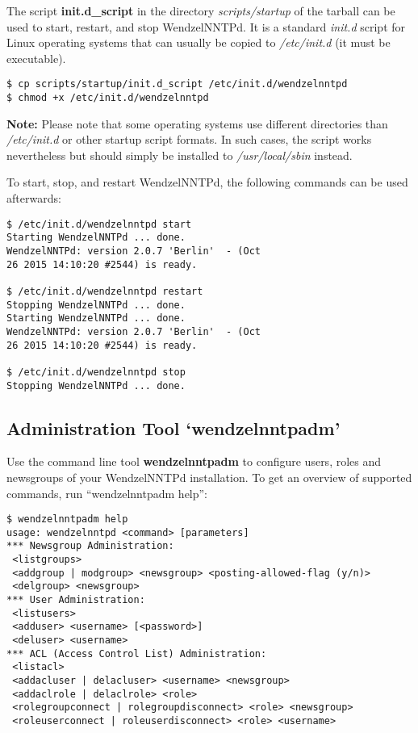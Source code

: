 \documentclass[12pt,fleqn,leqno]{scrbook}
\begin{document}
The script \textbf{init.d\_script} in the directory
\emph{scripts/startup} of the tarball can be used to start, restart, and
stop WendzelNNTPd. It is a standard \emph{init.d} script for Linux
operating systems that can usually be copied to \emph{/etc/init.d} (it
must be executable).

\begin{verbatim}
$ cp scripts/startup/init.d_script /etc/init.d/wendzelnntpd
$ chmod +x /etc/init.d/wendzelnntpd
\end{verbatim}

\textbf{Note:} Please note that some operating systems use different
directories than \emph{/etc/init.d} or other startup script formats. In
such cases, the script works nevertheless but should simply be installed
to \emph{/usr/local/sbin} instead.

To start, stop, and restart WendzelNNTPd, the following commands can be
used afterwards:

\begin{verbatim}
$ /etc/init.d/wendzelnntpd start
Starting WendzelNNTPd ... done.
WendzelNNTPd: version 2.0.7 'Berlin'  - (Oct
26 2015 14:10:20 #2544) is ready.

$ /etc/init.d/wendzelnntpd restart
Stopping WendzelNNTPd ... done.
Starting WendzelNNTPd ... done.
WendzelNNTPd: version 2.0.7 'Berlin'  - (Oct
26 2015 14:10:20 #2544) is ready.

$ /etc/init.d/wendzelnntpd stop
Stopping WendzelNNTPd ... done.
\end{verbatim}

\hypertarget{administration-tool-wendzelnntpadm-1}{%
\subsection{Administration Tool
`wendzelnntpadm'}\label{administration-tool-wendzelnntpadm-1}}

Use the command line tool \textbf{wendzelnntpadm} to configure users,
roles and newsgroups of your WendzelNNTPd installation. To get an
overview of supported commands, run ``wendzelnntpadm help'':

\begin{verbatim}
$ wendzelnntpadm help
usage: wendzelnntpd <command> [parameters]
*** Newsgroup Administration:
 <listgroups>
 <addgroup | modgroup> <newsgroup> <posting-allowed-flag (y/n)>
 <delgroup> <newsgroup>
*** User Administration:
 <listusers>
 <adduser> <username> [<password>]
 <deluser> <username>
*** ACL (Access Control List) Administration:
 <listacl>
 <addacluser | delacluser> <username> <newsgroup>
 <addaclrole | delaclrole> <role>
 <rolegroupconnect | rolegroupdisconnect> <role> <newsgroup>
 <roleuserconnect | roleuserdisconnect> <role> <username>
\end{verbatim}
\end{document}

